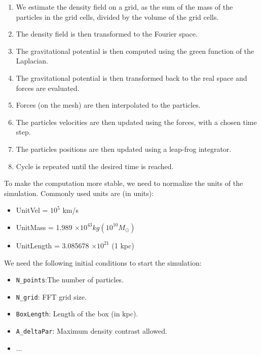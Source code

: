 \begin{enumerate}
    \item We estimate the density field on a grid, as the sum of the mass of the particles in the grid cells, divided by the volume of the grid cells.

    \item The density field is then transformed to the Fourier space.

    \item The gravitational potential is then computed using the green function of the Laplacian.

    \item The gravitational potential is then transformed back to the real space and forces are evaluated.

    \item Forces (on the mesh) are then interpolated to the particles.

    \item The particles velocities are then updated using the forces, with a chosen time step.

    \item The particles positions are then updated using a leap-frog integrator.

    \item Cycle is repeated until the desired time is reached.
\end{enumerate}

To make the computation more stable, we need to normalize the units of the simulation. Commonly used units are (in  units):

\begin{itemize}
    \item UnitVel = $10^5$ km/s
    \item UnitMass = 1.989 $\times 10^{43} kg (10^{10}M_\odot)$
    \item UnitLength = 3.085678 $\times 10^{21}$ (1 kpc)
\end{itemize}

We need the following initial conditions to start the simulation:

\begin{itemize}
    \item \texttt{N\_points}:The number of particles.
    \item \texttt{N\_grid}: FFT grid size.
    \item \texttt{BoxLength}: Length of the box (in kpc).
    \item \texttt{A\_deltaPar}: Maximum density contrast allowed.
    \item ...
\end{itemize}

